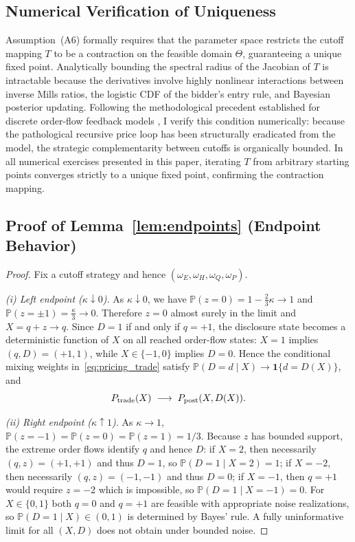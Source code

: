 \documentclass[11pt]{article}
\newcommand{\PP}{\mathbb{P}}
\newcommand{\1}{\mathbf{1}}
\begin{document}
\subsection{Numerical Verification of Uniqueness}
\label{app:proof-uniqueness}

Assumption~\textup{(A6)} formally requires that the parameter space restricts the cutoff mapping $T$ to be a contraction on the feasible domain $\Theta$, guaranteeing a unique fixed point. Analytically bounding the spectral radius of the Jacobian of $T$ is intractable because the derivatives involve highly nonlinear interactions between inverse Mills ratios, the logistic CDF of the bidder's entry rule, and Bayesian posterior updating. Following the methodological precedent established for discrete order-flow feedback models \citep{EdmansGoldsteinJiang2015}, I verify this condition numerically: because the pathological recursive price loop has been structurally eradicated from the model, the strategic complementarity between cutoffs is organically bounded. In all numerical exercises presented in this paper, iterating $T$ from arbitrary starting points converges strictly to a unique fixed point, confirming the contraction mapping.

\subsection{Proof of Lemma~\ref{lem:endpoints} (Endpoint Behavior)}
\label{app:proof-endpoints}

\begin{proof}
Fix a cutoff strategy and hence $(\omega_E,\omega_H,\omega_Q,\omega_P)$.

\textit{(i) Left endpoint ($\kappa\downarrow 0$).}
As $\kappa\downarrow 0$, we have $\PP(z=0)=1-\frac{2}{3}\kappa\to 1$ and $\PP(z=\pm 1)=\frac{\kappa}{3}\to 0$. Therefore $z=0$ almost surely in the limit and $X=q+z\to q$. Since $D=1$ if and only if $q=+1$, the disclosure state becomes a deterministic function of $X$ on all reached order-flow states: $X=1$ implies $(q,D)=(+1,1)$, while $X\in\{-1,0\}$ implies $D=0$. Hence the conditional mixing weights in~\eqref{eq:pricing_trade} satisfy $\PP(D=d\mid X)\to \1\{d=D(X)\}$, and
\[
P_{\textup{trade}}(X)\;\longrightarrow\;P_{\textup{post}}(X,D(X)).
\]

\textit{(ii) Right endpoint ($\kappa\uparrow 1$).}
As $\kappa\to 1$, $\PP(z=-1)=\PP(z=0)=\PP(z=1)=1/3$. Because $z$ has bounded support, the extreme order flows identify $q$ and hence $D$: if $X=2$, then necessarily $(q,z)=(+1,+1)$ and thus $D=1$, so $\PP(D=1\mid X=2)=1$; if $X=-2$, then necessarily $(q,z)=(-1,-1)$ and thus $D=0$; if $X=-1$, then $q=+1$ would require $z=-2$ which is impossible, so $\PP(D=1\mid X=-1)=0$. For $X\in\{0,1\}$ both $q=0$ and $q=+1$ are feasible with appropriate noise realizations, so $\PP(D=1\mid X)\in(0,1)$ is determined by Bayes' rule. A fully uninformative limit for all $(X,D)$ does not obtain under bounded noise.
\end{proof}
\end{document}
